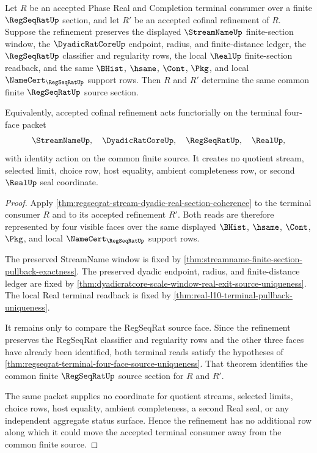 \begin{theorem}
\label{thm:regseqrat-four-face-refinement-functoriality}
Let $R$ be an accepted Phase Real and Completion terminal consumer over a
finite $\RegSeqRatUp$ section, and let $R'$ be an accepted cofinal refinement
of $R$. Suppose the refinement preserves the displayed $\StreamNameUp$
finite-section window, the $\DyadicRatCoreUp$ endpoint, radius, and
finite-distance ledger, the $\RegSeqRatUp$ classifier and regularity rows, the
local $\RealUp$ finite-section readback, and the same $\BHist$, $\hsame$,
$\Cont$, $\Pkg$, and local $\NameCert_{\RegSeqRatUp}$ support rows. Then $R$
and $R'$ determine the same common finite $\RegSeqRatUp$ source section.

Equivalently, accepted cofinal refinement acts functorially on the terminal
four-face packet
$$
\StreamNameUp,\quad \DyadicRatCoreUp,\quad \RegSeqRatUp,\quad \RealUp,
$$
with identity action on the common finite source. It creates no quotient
stream, selected limit, choice row, host equality, ambient completeness row,
or second $\RealUp$ seal coordinate.
\end{theorem}
\begin{proof}
Apply \autoref{thm:regseqrat-stream-dyadic-real-section-coherence} to the
terminal consumer $R$ and to its accepted refinement $R'$. Both reads are
therefore represented by four visible faces over the same displayed
$\BHist$, $\hsame$, $\Cont$, $\Pkg$, and local $\NameCert_{\RegSeqRatUp}$
support rows.

The preserved StreamName window is fixed by
\autoref{thm:streamname-finite-section-pullback-exactness}. The preserved
dyadic endpoint, radius, and finite-distance ledger are fixed by
\autoref{thm:dyadicratcore-scale-window-real-exit-source-uniqueness}. The
local Real terminal readback is fixed by
\autoref{thm:real-l10-terminal-pullback-uniqueness}.

It remains only to compare the RegSeqRat source face. Since the refinement
preserves the RegSeqRat classifier and regularity rows and the other three
faces have already been identified, both terminal reads satisfy the
hypotheses of
\autoref{thm:regseqrat-terminal-four-face-source-uniqueness}. That theorem
identifies the common finite $\RegSeqRatUp$ source section for $R$ and $R'$.

The same packet supplies no coordinate for quotient streams, selected limits,
choice rows, host equality, ambient completeness, a second Real seal, or any
independent aggregate status surface. Hence the refinement has no additional
row along which it could move the accepted terminal consumer away from the
common finite source.
\end{proof}

